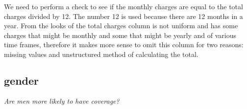 \documentclass[]{article}
\newenvironment{Shaded}{\begin{snugshade}}{\end{snugshade}}
\newcommand{\KeywordTok}[1]{\textcolor[rgb]{0.13,0.29,0.53}{\textbf{#1}}}
\newcommand{\DataTypeTok}[1]{\textcolor[rgb]{0.13,0.29,0.53}{#1}}
\newcommand{\DecValTok}[1]{\textcolor[rgb]{0.00,0.00,0.81}{#1}}
\newcommand{\FloatTok}[1]{\textcolor[rgb]{0.00,0.00,0.81}{#1}}
\newcommand{\StringTok}[1]{\textcolor[rgb]{0.31,0.60,0.02}{#1}}
\newcommand{\CommentTok}[1]{\textcolor[rgb]{0.56,0.35,0.01}{\textit{#1}}}
\newcommand{\OtherTok}[1]{\textcolor[rgb]{0.56,0.35,0.01}{#1}}
\newcommand{\OperatorTok}[1]{\textcolor[rgb]{0.81,0.36,0.00}{\textbf{#1}}}
\newcommand{\NormalTok}[1]{#1}
\begin{document}
\begin{Shaded}
\end{Shaded}

We need to perform a check to see if the monthly charges are equal to
the total charges divided by 12. The number 12 is used because there are
12 months in a year. From the looks of the total charges column is not
uniform and has some charges that might be monthly and some that might
be yearly and of various time frames, therefore it makes more sense to
omit this column for two reasons: missing values and unstructured method
of calculating the total.

\subsection{gender}\label{gender}

\emph{Are men more likely to have coverage?}

\begin{Shaded}
\end{Shaded}
\end{document}
